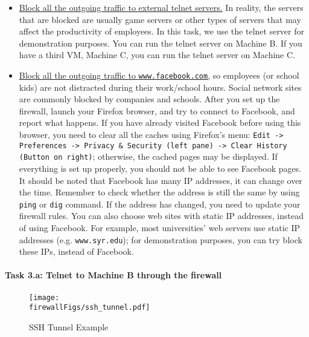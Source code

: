 \begin{itemize}
\item \underline{Block all the outgoing traffic to external telnet servers.}  In
reality, the servers that are blocked are usually game servers or other
types of servers that may affect the productivity of employees. In this 
task, we use the telnet server for demonstration purposes. You can run
the telnet server on Machine B.
If you have a third VM, Machine C, you can run the 
telnet server on Machine C. 


\item \underline{Block all the outgoing traffic to {\tt www.facebook.com},} so employees 
(or school kids) are not distracted during their work/school hours. Social
network sites are commonly blocked by companies and schools. After 
you set up the firewall, launch your Firefox browser, and try to connect to Facebook, and report
what happens. If you have already visited Facebook before using this 
browser, you need to clear all the caches using 
Firefox's menu: 
\texttt{Edit -> Preferences -> Privacy \& Security (left pane) -> Clear History (Button on right)}; 
otherwise, the cached
pages may be displayed. If everything is set up properly, you 
should not be able to see Facebook pages. 
It should be noted that Facebook has many IP addresses, it can 
change over the time. Remember to check whether the address is 
still the same by using {\tt ping} or {\tt dig} command. If 
the address has changed, you need to update your firewall rules. 
You can also choose web sites with static IP addresses, instead of using Facebook.
For example, most universities' web servers use static IP addresses (e.g. 
{\tt www.syr.edu}); for demonstration purposes, 
you can try block these IPs, instead of Facebook. 

\end{itemize}



\paragraph{Task 3.a: Telnet to Machine B through the firewall}


\begin{figure}[htb]
\begin{center}
\texttt{[image: \\firewallFigs/ssh\_tunnel.pdf]}
\end{center}
\caption{SSH Tunnel Example}
\label{firewall:fig:sshtunnel}
\end{figure}
 


